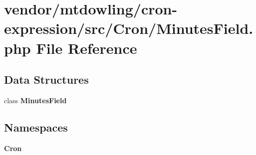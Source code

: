\section{vendor/mtdowling/cron-\/expression/src/\+Cron/\+Minutes\+Field.php File Reference}
\label{_minutes_field_8php}
\subsection*{Data Structures}
\begin{DoxyCompactItemize}
\item 
class {\bf Minutes\+Field}
\end{DoxyCompactItemize}
\subsection*{Namespaces}
\begin{DoxyCompactItemize}
\item 
 {\bf Cron}
\end{DoxyCompactItemize}
